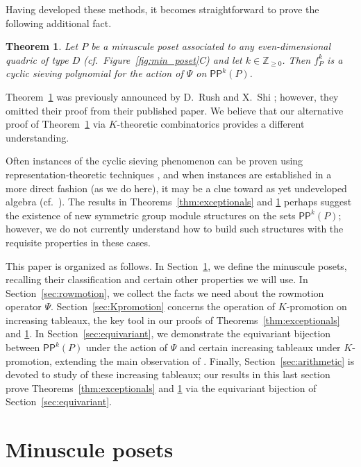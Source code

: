 \documentclass[12pt]{amsart}
\newtheorem{theorem}{Theorem}[section]
\theoremstyle{definition}
\theoremstyle{remark}
\numberwithin{equation}{section}
\newcommand{\pp}{\ensuremath{\mathsf{PP}}}
\begin{document}
Having developed these methods, it becomes straightforward to prove the following additional fact.
\begin{theorem}\label{thm:propeller}
Let $P$ be a minuscule poset associated to any even-dimensional quadric of type $D$ (cf.~Figure~\ref{fig:min_poset}C) and let $k \in \mathbb{Z}_{\geq 0}$. Then $f_P^k$ is a cyclic sieving polynomial for the action of $\Psi$ on $\pp^k(P)$.
\end{theorem}
Theorem~\ref{thm:propeller} was previously announced by D.~Rush and X.~Shi \cite[Theorem~10.1]{Rush.Shi}; however, they omitted their proof \cite[]{Rush.Shi:report} from their published paper. We believe that our alternative proof of Theorem~\ref{thm:propeller} via $K$-theoretic combinatorics provides a different understanding.

Often instances of the cyclic sieving phenomenon can be proven using representation-theoretic techniques \cite{Reiner.Stanton.White, Rhoades:thesis}, and when instances are established in a more direct fashion (as we do here), it may be a clue toward as yet undeveloped algebra (cf.\ \cite{Rhoades:skein}). The results in Theorems~\ref{thm:exceptionals} and \ref{thm:propeller} perhaps suggest the existence of new symmetric group module structures on the sets $\pp^k(P)$; however, we do not currently understand how to build such structures with the requisite properties in these cases.

This paper is organized as follows. In Section~\ref{sec:minuscule}, we define the minuscule posets, recalling their classification and certain other properties we will use. In Section~\ref{sec:rowmotion}, we collect the facts we need about the rowmotion operator $\Psi$. Section~\ref{sec:Kpromotion} concerns the operation of $K$-promotion on increasing tableaux, the key tool in our proofs of Theorems~\ref{thm:exceptionals} and \ref{thm:propeller}. In Section~\ref{sec:equivariant}, we demonstrate the equivariant bijection between $\pp^k(P)$ under the action of $\Psi$ and certain increasing tableaux under $K$-promotion, extending the main observation of \cite{DPS}.
Finally, Section~\ref{sec:arithmetic} is devoted to study of these increasing tableaux; our results in this last section prove Theorems~\ref{thm:exceptionals} and \ref{thm:propeller} via the equivariant bijection of Section~\ref{sec:equivariant}.

\section{Minuscule posets}\label{sec:minuscule}
\end{document}

